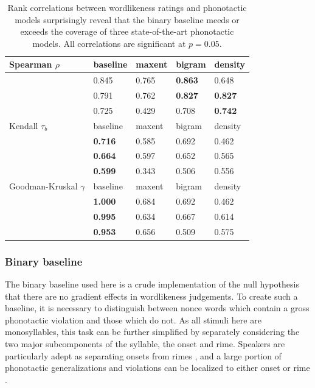 \begin{table} \centering
\begin{tabular}{l l l l l}
\toprule
Spearman $\rho$          & baseline         & maxent  & bigram           & density          \\
\midrule
\citealt{Greenberg1964}  & {0.845}          & {0.765} & {\textbf{0.863}} & {0.648}          \\
\citealt{Scholes1966}    & {0.791}          & {0.762} & {\textbf{0.827}} & {\textbf{0.827}} \\
\citealt{Albright2003b}  & {0.725}          & {0.429} & {0.708}          & {\textbf{0.742}} \\
\midrule
Kendall $\tau_b$         & baseline         & maxent  & bigram           & density          \\
\midrule
\citealt{Greenberg1964}  & {\textbf{0.716}} & {0.585} & {0.692}          & {0.462}          \\
\citealt{Scholes1966}    & {\textbf{0.664}} & {0.597} & {0.652}          & {0.565}          \\
\citealt{Albright2003b}  & {\textbf{0.599}} & {0.343} & {0.506}          & {0.556}          \\
\midrule
Goodman-Kruskal $\gamma$ & baseline         & maxent  & bigram           & density          \\
\midrule
\citealt{Greenberg1964}  & {\textbf{1.000}} & {0.684} & {0.692}          & {0.462}          \\
\citealt{Scholes1966}    & {\textbf{0.995}} & {0.634} & {0.667}          & {0.614}          \\
\citealt{Albright2003b}  & {\textbf{0.953}} & {0.656} & {0.509}          & {0.575}          \\
\bottomrule
\end{tabular}
\caption{Rank correlations between wordlikeness ratings and phonotactic models surprisingly reveal that the binary baseline meeds or exceeds the coverage of three state-of-the-art phonotactic models. All correlations are significant at $p = 0.05$.}
\label{cor}
\end{table}

\subsubsection{Binary baseline}

The binary baseline used here is a crude implementation of the null hypothesis that there are no gradient effects in wordlikeness judgements. To create such a baseline, it is necessary to distinguish between nonce words which contain a gross phonotactic violation and those which do not. As all stimuli here are monosyllables, this task can be further simplified by separately considering the two major subcomponents of the syllable, the onset and rime. Speakers are particularly adept as separating onsets from rimes \citep{Treiman1986,Treiman1995,Fowler1993}, and a large portion of phonotactic generalizations and violations can be localized to either onset or rime \citep[e.g.,][]{Fudge1969,Treiman1995,Kessler1997,Treiman2000}.

